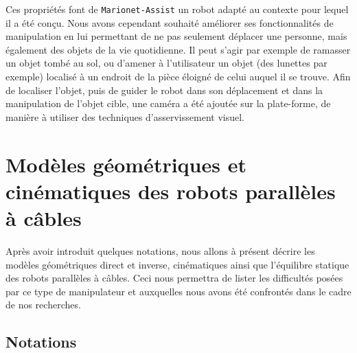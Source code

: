 Ces propriétés font de {\tt Marionet-Assist} un robot adapté au contexte pour 
lequel il a été conçu. Nous avons cependant souhaité améliorer ses 
fonctionnalités de manipulation en lui permettant de ne pas seulement déplacer 
une personne, mais également des objets de la vie quotidienne. Il peut s'agir 
par exemple de ramasser un objet tombé au sol, ou d'amener à l'utilisateur un 
objet (des lunettes par exemple) localisé à un endroit de la pièce éloigné de 
celui auquel il se trouve. Afin de localiser l'objet, puis de guider le robot 
dans son déplacement et dans la manipulation de l'objet cible, une caméra a été 
ajoutée sur la plate-forme, de manière à utiliser des techniques 
d'asservissement visuel.

\section{Mod\`eles g\'eom\'etriques et cin\'ematiques des robots parall\`eles 
\`a c\^ables} \label{chap0-2}

Après avoir introduit quelques notations, nous allons à présent décrire les 
modèles géométriques direct et inverse, cinématiques ainsi que l'équilibre 
statique des robots parallèles à câbles. Ceci nous permettra de lister 
les difficultés posées par ce type de manipulateur et auxquelles nous avons été 
confrontés dans le cadre de nos recherches.

\subsection{Notations} \label{chap0-2-0}

\begin{figure}[!ht]
\centering
\def\svgwidth{.85\linewidth}

\end{figure}

